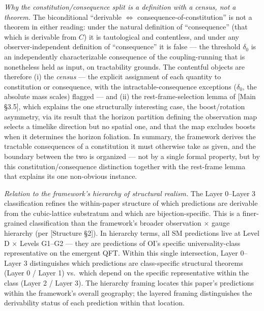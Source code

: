 \documentclass[
]{article}
\begin{document}
\emph{Why the constitution/consequence split is a definition with a
census, not a theorem.} The biconditional ``derivable
\(\Leftrightarrow\) consequence-of-constitution'' is not a theorem in
either reading: under the natural definition of ``consequence'' (that
which is derivable from \(C\)) it is tautological and contentless, and
under any observer-independent definition of ``consequence'' it is false
--- the threshold \(\delta_0\) is an independently characterizable
consequence of the coupling-running that is nonetheless held as input,
on tractability grounds. The contentful objects are therefore (i) the
\emph{census} --- the explicit assignment of each quantity to
constitution or consequence, with the intractable-consequence exceptions
(\(\delta_0\), the absolute mass scales) flagged --- and (ii) the
rest-frame-selection lemma of {[}Main §3.5{]}, which explains the one
structurally interesting case, the boost/rotation asymmetry, via its
result that the horizon partition defining the observation map selects a
timelike direction but no spatial one, and that the map excludes boosts
when it determines the horizon foliation. In summary, the framework
derives the tractable consequences of a constitution it must otherwise
take as given, and the boundary between the two is organized --- not by
a single formal property, but by this constitution/consequence
distinction together with the rest-frame lemma that explains its one
non-obvious instance.

\emph{Relation to the framework's hierarchy of structural realism.} The
Layer 0--Layer 3 classification refines the within-paper structure of
which predictions are derivable from the cubic-lattice substratum and
which are bijection-specific. This is a finer-grained classification
than the framework's broader observation × gauge hierarchy (per
{[}Structure §2{]}). In hierarchy terms, all SM predictions live at
Level D × Levels G1--G2 --- they are predictions of OI's specific
universality-class representative on the emergent QFT. Within this
single intersection, Layer 0--Layer 3 distinguishes which predictions
are class-specific structural theorems (Layer 0 / Layer 1) vs.~which
depend on the specific representative within the class (Layer 2 / Layer
3). The hierarchy framing locates this paper's predictions within the
framework's overall geography; the layered framing distinguishes the
derivability status of each prediction within that location.
\end{document}
